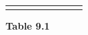 {\begin{center}
\begin{xtabular*}{\mytablewidth}[t]{|p{10\mystarwidth}|p{10\mystarwidth}|p{10\mystarwidth}|p{10\mystarwidth}|p{10\mystarwidth}|p{10\mystarwidth}|p{10\mystarwidth}|p{10\mystarwidth}|}
         &
    
    
         &
    
    
         &
    
    
         &
    
    
         &
    
    
     \tabularnewline{}
    \end{xtabular*}
      \end{center}
    \begin{center}{\small\bfseries Table 9.1}\end{center}
    
    \addtocounter{footnote}{-0}
    
        }%
      
    \par
  
      
      
    
